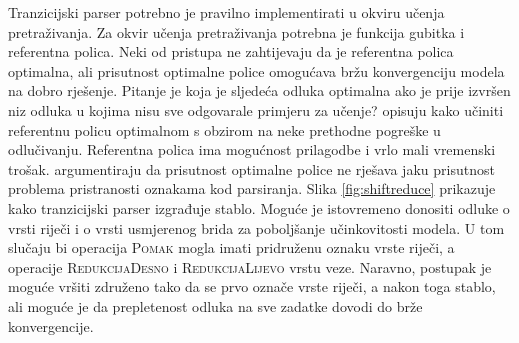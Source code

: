 Tranzicijski parser potrebno je pravilno implementirati u okviru učenja
pretraživanja. Za okvir učenja pretraživanja potrebna je funkcija gubitka i
referentna polica. Neki od pristupa ne zahtijevaju da je referentna polica
optimalna, ali prisutnost optimalne police omogućava bržu konvergenciju modela
na dobro rješenje. Pitanje je koja je sljedeća odluka optimalna ako je prije
izvršen niz odluka u kojima nisu sve odgovarale primjeru za učenje?
\citet{goldberg2013training} opisuju kako učiniti referentnu policu optimalnom s
obzirom na neke prethodne pogreške u odlučivanju. Referentna polica ima
mogućnost prilagodbe i vrlo mali vremenski trošak. \citet{andor2016globally}
argumentiraju da prisutnost optimalne police ne rješava jaku prisutnost problema
pristranosti oznakama kod parsiranja. Slika \ref{fig:shiftreduce} prikazuje kako
tranzicijski parser izgrađuje stablo. Moguće je istovremeno donositi odluke o
vrsti riječi i o vrsti usmjerenog brida za poboljšanje učinkovitosti modela. U
tom slučaju bi operacija \textsc{Pomak} mogla imati pridruženu oznaku vrste
riječi, a operacije \textsc{RedukcijaDesno} i \textsc{RedukcijaLijevo} vrstu
veze. Naravno, postupak je moguće vršiti združeno tako da se prvo označe vrste
riječi, a nakon toga stablo, ali moguće je da prepletenost odluka na sve zadatke
dovodi do brže konvergencije.


